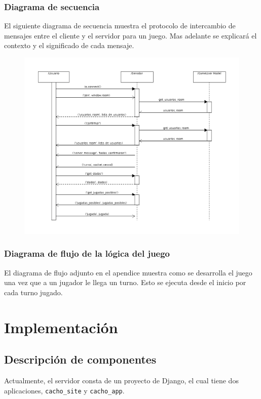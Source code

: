 \documentclass[a4paper,11pt]{article}
\begin{document}
\subsubsection{Diagrama de secuencia}
El siguiente diagrama de secuencia muestra el protocolo de intercambio de mensajes
entre el cliente y el servidor para un juego. Mas adelante se explicará el contexto
y el significado de cada mensaje.
\begin{figure}[h!]
	\centering
	\includegraphics[width=\textwidth]{seq_juego.png}
\end{figure}

\subsubsection{Diagrama de flujo de la lógica del juego}
El diagrama de flujo adjunto en el apendice muestra como se desarrolla el juego una vez
que a un jugador le llega un turno. Esto se ejecuta desde el inicio por cada
turno jugado.

\newpage
\section{Implementación}
\subsection{Descripción de componentes}
Actualmente, el servidor consta de un proyecto de Django, el cual tiene dos aplicaciones,
\texttt{cacho\_site} y \texttt{cacho\_app}.\\
\end{document}
